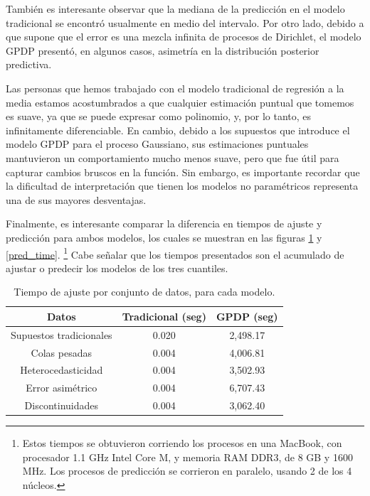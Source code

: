 Tambi\'en es interesante observar que la mediana de la predicci\'on en el modelo tradicional se encontr\'o usualmente en medio del intervalo. Por otro lado, debido a que supone que el error es una mezcla infinita de procesos de Dirichlet, el modelo GPDP present\'o, en algunos casos, asimetr\'ia en la distribuci\'on posterior predictiva.

Las personas que hemos trabajado con el modelo tradicional de regresi\'on a la media estamos acostumbrados a que cualquier estimaci\'on puntual que tomemos es suave, ya que se puede expresar como polinomio, y, por lo tanto, es infinitamente diferenciable. En cambio, debido a los supuestos que introduce el modelo GPDP para el proceso Gaussiano, sus estimaciones puntuales mantuvieron un comportamiento mucho menos suave, pero que fue \'util para capturar cambios bruscos en la funci\'on. Sin embargo, es importante recordar que la dificultad de interpretaci\'on que tienen los modelos no param\'etricos representa una de sus mayores desventajas.

Finalmente, es interesante comparar la diferencia en tiempos de ajuste y predicci\'on para ambos modelos, los cuales se muestran en las figuras \ref{fit_time} y \ref{pred_time}. \footnote{Estos tiempos se obtuvieron corriendo los procesos en una MacBook, con procesador 1.1 GHz Intel Core M, y memoria RAM DDR3, de 8 GB y 1600 MHz. Los procesos de predicci\'on se corrieron en paralelo, usando 2 de los 4 núcleos.} Cabe señalar que los tiempos presentados son el acumulado de ajustar o predecir los modelos de los tres cuantiles.

\begin{table}[H]
\centering
\caption{Tiempo de ajuste por conjunto de datos, para cada modelo.} 
\begin{tabular}{ccc}
  \hline
Datos & Tradicional (seg) & GPDP (seg) \\ 
  \hline
Supuestos tradicionales & 0.020 & 2,498.17 \\ 
  Colas pesadas & 0.004 & 4,006.81 \\ 
  Heterocedasticidad & 0.004 & 3,502.93 \\ 
  Error asimétrico & 0.004 & 6,707.43 \\ 
  Discontinuidades & 0.004 & 3,062.40 \\ 
   \hline
\end{tabular}
\label{fit_time}
\end{table}

